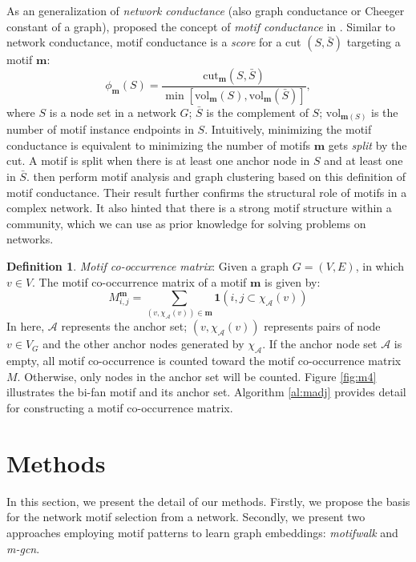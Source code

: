 \documentclass{article}
\theoremstyle{definition}
\newtheorem{definition}{Definition}[section]
\begin{document}
As an generalization of \emph{network conductance} (also graph conductance 
or Cheeger constant of a graph), \citeauthor{juremotif} proposed
the concept of \emph{motif conductance} in \cite{juremotif}. Similar to
network conductance, motif conductance is a \emph{score} for a cut 
$(S, \bar{S})$ targeting a motif $\mathbf{m}$:
\begin{equation*}
	\phi_{\mathbf{m}}(S) = \frac{\mbox{cut}_{\mathbf{m}}(S,\bar{S})}{\min[\mbox{vol}_{\mathbf{m}}(S), \mbox{vol}_{\mathbf{m}}(\bar{S})]},
\end{equation*}
where $S$ is a node set in a network $G$; $\bar{S}$ is the complement
of $S$; $\mbox{vol}_{\mathbf{m}(S)}$ is the number of motif instance
endpoints in $S$. Intuitively, minimizing the motif conductance is
equivalent to minimizing the number of motifs $\mathbf{m}$ gets 
\emph{split} by the cut. A motif is split when there is at least one
anchor node in $S$ and at least one in $\bar{S}$. \citeauthor{juremotif}
then perform motif analysis and graph clustering based on this
definition of motif conductance. Their result further confirms the
structural role of motifs in a complex network. It also hinted that there
is a strong motif structure within a community, which we can use as
prior knowledge for solving problems on networks.

\begin{definition} \emph{Motif co-occurrence matrix}:
Given a graph $G = (V,E)$, in which $v \in V$. The motif co-occurrence 
matrix of a motif $\mathbf{m}$ is given by:
$$M_{i,j}^{\mathbf{m}} = \sum_{(v, \chi_{\mathcal{A}}(v)) \in \mathbf{m}} \mathbf{1}({i,j} \subset \chi_\mathcal{A}(v))$$
In here, $\mathcal{A}$ represents the anchor set; 
$(v, \chi_{\mathcal{A}}(v))$ represents pairs of node $v \in V_G$ and the 
other anchor nodes generated by $\chi_\mathcal{A}$. If the anchor node set 
$\mathcal{A}$ is empty, all motif co-occurrence is counted toward the 
motif co-occurrence matrix $M$. Otherwise, only nodes in the anchor set 
will be counted. Figure \ref{fig:m4} illustrates the bi-fan motif and 
its anchor set. Algorithm \ref{al:madj} provides detail for constructing
a motif co-occurrence matrix.
\end{definition}


\section{Methods}

In this section, we present the detail of our methods. Firstly,
we propose the basis for the network motif selection from a network.
Secondly, we present two approaches employing motif patterns to
learn graph embeddings: \emph{motifwalk} and \emph{m-gcn}.
\end{document}

